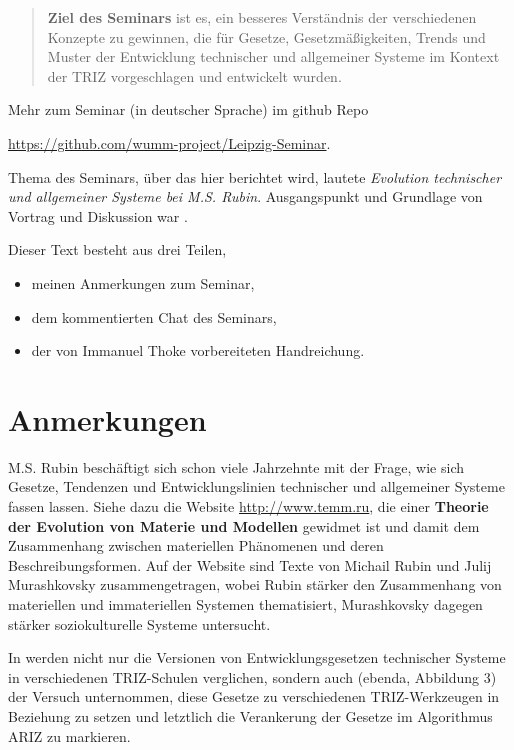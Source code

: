 \documentclass[a4paper,11pt]{article}
\begin{document}
\begin{quote}
  \textbf{Ziel des Seminars} ist es, ein besseres Verständnis der
  verschiedenen Konzepte zu gewinnen, die für Gesetze, Gesetzmäßigkeiten,
  Trends und Muster der Entwicklung technischer und allgemeiner Systeme im
  Kontext der TRIZ vorgeschlagen und entwickelt wurden.
\end{quote}

Mehr zum Seminar (in deutscher Sprache) im github Repo
\begin{center}
  \url{https://github.com/wumm-project/Leipzig-Seminar}.
\end{center}

Thema des Seminars, über das hier berichtet wird, lautete \emph{Evolution
  technischer und allgemeiner Systeme bei M.S. Rubin}.  Ausgangspunkt und
Grundlage von Vortrag und Diskussion war \cite{Rubin2019}.

Dieser Text besteht aus drei Teilen,
\begin{itemize}[noitemsep]
\item meinen Anmerkungen zum Seminar,
\item dem kommentierten Chat des Seminars,
\item der von Immanuel Thoke vorbereiteten Handreichung.
\end{itemize}

\section{Anmerkungen}

M.S. Rubin beschäftigt sich schon viele Jahrzehnte mit der Frage, wie sich
Gesetze, Tendenzen und Entwicklungslinien technischer und allgemeiner Systeme
fassen lassen. Siehe dazu die Website \url{http://www.temm.ru}, die einer
\textbf{Theorie der Evolution von Materie und Modellen} gewidmet ist und damit
dem Zusammenhang zwischen materiellen Phänomenen und deren
Beschreibungsformen.  Auf der Website sind Texte von Michail Rubin und Julij
Murashkovsky zusammengetragen, wobei Rubin stärker den Zusammenhang von
materiellen und immateriellen Systemen thematisiert, Murashkovsky dagegen
stärker soziokulturelle Systeme untersucht.

In \cite{Rubin2019} werden nicht nur die Versionen von Entwicklungsgesetzen
technischer Systeme in verschiedenen TRIZ-Schulen verglichen, sondern auch
(ebenda, Abbildung 3) der Versuch unternommen, diese Gesetze zu verschiedenen
TRIZ-Werkzeugen in Beziehung zu setzen und letztlich die Verankerung der
Gesetze im Algorithmus ARIZ zu markieren.
\end{document}
